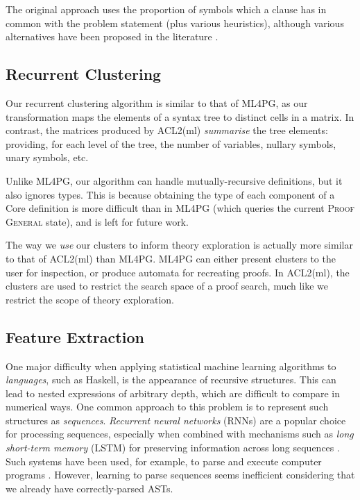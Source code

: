 The original approach uses the proportion of symbols which a clause has in
common with the problem statement \cite{meng2009lightweight} (plus various
heuristics), although various alternatives have been proposed in the literature
\cite{kuhlwein2013mash} \cite{kuhlwein2012overview} \cite{alama2014premise}.

\subsection{Recurrent Clustering}
\label{sec:clusteringexpressions}

Our recurrent clustering algorithm is similar to that of ML4PG, as our
transformation maps the elements of a syntax tree to distinct cells in a
matrix. In contrast, the matrices produced by ACL2(ml) \emph{summarise} the tree
elements: providing, for each level of the tree, the number of variables,
nullary symbols, unary symbols, etc.

Unlike ML4PG, our algorithm can handle mutually-recursive definitions, but it
also ignores types. This is because obtaining the type of each component of a
Core definition is more difficult than in ML4PG (which queries the current
\textsc{Proof General} state), and is left for future work.

The way we \emph{use} our clusters to inform theory exploration is actually more
similar to that of ACL2(ml) than ML4PG. ML4PG can either present clusters to the
user for inspection, or produce automata for recreating proofs. In ACL2(ml), the
clusters are used to restrict the search space of a proof search, much like we
restrict the scope of theory exploration.

\subsection{Feature Extraction}

One major difficulty when applying statistical machine learning algorithms to
\emph{languages}, such as Haskell, is the appearance of recursive
structures. This can lead to nested expressions of arbitrary depth, which are
difficult to compare in numerical ways. One common approach to this problem is
to represent such structures as \emph{sequences}. \emph{Recurrent neural
  networks} (RNNs) are a popular choice for processing sequences, especially
when combined with mechanisms such as \emph{long short-term memory} (LSTM) for
preserving information across long sequences \cite{hochreiter1997long}. Such
systems have been used, for example, to parse and execute computer programs
\cite{zaremba2014learning}. However, learning to parse sequences seems
inefficient considering that we already have correctly-parsed ASTs.

